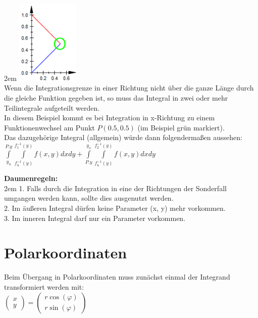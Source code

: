 \documentclass[11pt,final]{scrreprt}
\newcommand{\br} {\medskip\\}
\begin{document}
\begingroup
\leftskip2em 
\includegraphics[width=3cm]{images/flaechenintegral/funktionenWechsel.png}\\
Wenn die Integrationsgrenze in einer Richtung nicht über die ganze Länge durch die gleiche Funktion gegeben ist, so muss das Integral in zwei oder mehr Teilintegrale aufgeteilt werden.\\
In diesem Beispiel kommt es bei Integration in x-Richtung zu einem Funktionenwechsel am Punkt $P(0.5, 0.5)$ (im Beispiel grün markiert).\\
Das dazugehörige Integral (allgemein) würde dann folgendermaßen aussehen:\br
$\int\limits_{y_u}^{P.y} \int\limits_{f_u^{-1}(y)}^{f_1^{-1}(y)} f(x, y) dx dy + \int\limits_{P.y}^{y_o} \int\limits_{f_u^{-1}(y)}^{f_2^{-1}(y)} f(x, y) dx dy$\\
\par	
\endgroup

\textbf{Daumenregeln:}\\

\begingroup
\leftskip2em 
1. Falls durch die Integration in eine der Richtungen der Sonderfall umgangen werden kann, sollte dies ausgenutzt werden.\br
2. Im äußeren Integral dürfen keine Parameter (x, y) mehr vorkommen.\br
3. Im inneren Integral darf nur ein Parameter vorkommen.\\
\par	
\endgroup


\section{Polarkoordinaten}

Beim Übergang in Polarkoordinaten muss zunächst einmal der Integrand transformiert werden mit:\\

$ \left( \begin{matrix}
x\\y
\end{matrix}\right) = \left( \begin{matrix}
r\cos(\varphi)\\r\sin(\varphi)
\end{matrix}\right) $\\
\end{document}

